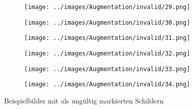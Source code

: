 \begin{figure}[H]
\hspace{1em}%
\begin{subfigure}[b]{0.1\textwidth}
\centering
\texttt{[image: ../images/Augmentation/invalid/29.png]}
\end{subfigure}
\hspace{1em}%
\begin{subfigure}[b]{0.1\textwidth}
\centering
\texttt{[image: ../images/Augmentation/invalid/30.png]}
\end{subfigure}
\hspace{1em}%
\begin{subfigure}[b]{0.1\textwidth}
\centering
\texttt{[image: ../images/Augmentation/invalid/31.png]}
\end{subfigure}
\hspace{1em}%
\begin{subfigure}[b]{0.1\textwidth}
\centering
\texttt{[image: ../images/Augmentation/invalid/32.png]}
\end{subfigure}
\hspace{1em}%
\begin{subfigure}[b]{0.1\textwidth}
\centering
\texttt{[image: ../images/Augmentation/invalid/33.png]}
\end{subfigure}
\hspace{1em}%
\begin{subfigure}[b]{0.1\textwidth}
\centering
\texttt{[image: ../images/Augmentation/invalid/34.png]}
\end{subfigure}
\caption{Beispielbilder mit als ungültig markierten Schildern}
\label{fig:invalid-imgs}
\end{figure}


